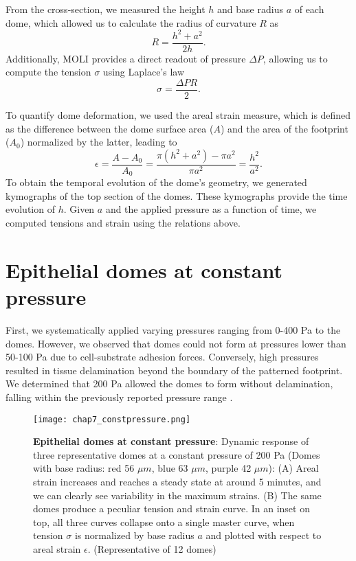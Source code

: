 From the cross-section, we measured the height $h$ and base radius $a$ of each dome, which allowed us to calculate the radius of curvature $R$ as
\begin{equation}
	\label{eqn:radiuscurve}
	R = \frac{h^2 + a^2}{2h}.
\end{equation}
Additionally, MOLI provides a direct readout of pressure $\Delta P$, allowing us to compute the tension $\sigma$ using Laplace's law
\begin{equation}
	\label{eqn:laplace}
	\sigma = \frac{\Delta PR }{2} .
\end{equation}

To quantify dome deformation, we used the areal strain measure, which is defined as the difference between the dome surface area ($A$) and the area of the footprint ($A_{0}$) normalized by the latter, leading to
\begin{equation}
	\label{eqn:arealstrain}
	\epsilon = \frac{A - A_{0}}{A_{0}} = \frac{\pi(h^2 + a^2) - \pi a^2}{\pi a^2} = \frac{h^2}{a^2} .
\end{equation}
To obtain the temporal evolution of the dome’s geometry, we generated kymographs of the top section of the domes. These kymographs provide the time evolution of $h$. Given $a$ and the applied pressure as a function of time, we computed tensions and strain using the relations above.

\hypertarget{epithelial-domes-at-constant-pressure}{%
	\section{Epithelial domes at constant
		pressure}\label{epithelial-domes-at-constant-pressure}}

First, we systematically applied varying pressures ranging from 0-400 \unit{\pascal} to the domes. However, we observed that domes could not form at pressures lower than 50-100 \unit{\pascal} due to cell-substrate adhesion forces. Conversely, high pressures resulted in tissue delamination beyond the boundary of the patterned footprint. We determined that 200 \unit{\pascal} allowed the domes to form without delamination, falling within the previously reported pressure range \cite{choudhury2022,marin-llaurado2022}.

\begin{figure}[b!]
	\centering
	\texttt{[image: chap7\_constpressure.png]}
	\caption{\label{fig_7_3} \textbf{Epithelial domes at constant pressure}: Dynamic response of three representative domes at a constant pressure of 200 Pa (Domes with base radius: red 56 $\mu m$, blue 63 $\mu m$, purple 42 $\mu m$): (A) Areal strain increases and reaches a steady state at around 5 minutes, and we can clearly see variability in the maximum strains. (B) The same domes produce a peculiar tension and strain curve. In an inset on top, all three curves collapse onto a single  master curve, when tension $\sigma$ is normalized by base radius $a$ and plotted with respect to areal strain $\epsilon$. (Representative of 12 domes)
	}
\end{figure}

